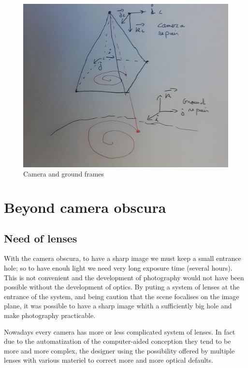 \begin{figure}
\centering
	\includegraphics[width=12cm]{Methods/Images/RepairCam.jpg}
	\caption{Camera and ground frames}
	\label{fig:FormIm}
\end{figure}


\section{Beyond camera obscura}

\subsection{Need of lenses}

With the camera obscura, to have a sharp image we must keep a small entrance hole;
so to have enouh light we need very long exposure time (several hours). 
This is not convenient and the development of photography
would not have been possible without the development of optics. By puting a system
of lenses at the entrance of the system, and being caution that the  scene focalises
on the image plane, it was possible to have a sharp image whith a sufficiently big
hole and make photography practicable.

Nowadays every camera has more or less complicated system of lenses. In fact due to the
automatization of the computer-aided conception they tend to be more and more complex, the designer
using the possibility offered by multiple lenses with various materiel to correct more and more optical defaults.

